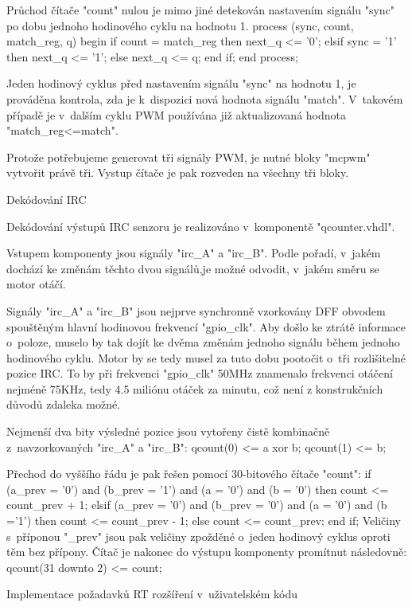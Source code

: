 Průchod čítače "count" nulou je mimo jiné detekován nastavením signálu "sync" po dobu jednoho hodinového cyklu na hodnotu 1.
\begtt
process (sync, count, match_reg, q)  
begin
  if count = match_reg then 
    next_q <= '0';
  elsif sync = '1' then 			
    next_q <= '1';
  else
    next_q <= q;
  end if;
end process;\endtt
  
   Jeden hodinový cyklus před nastavením signálu "sync" na hodnotu 1, je prováděna kontrola, zda je k~dispozici nová hodnota signálu "match". V~takovém případě je v~dalším cyklu PWM používána již aktualizovaná hodnota "match_reg<=match". 

Protože potřebujeme generovat tři signály PWM, je nutné bloky "mcpwm" vytvořit právě tři. Vystup čítače je pak rozveden na všechny tři bloky.  


\sec Dekódování IRC

Dekódování výstupů IRC senzoru je realizováno v~komponentě "qcounter.vhdl". 

Vstupem komponenty jsou signály "irc_A" a "irc_B". Podle pořadí, v~jakém dochází ke změnám těchto dvou signálů,je možné odvodit, v~jakém směru se motor otáčí.

Signály "irc_A" a "irc_B" jsou nejprve synchronně vzorkovány DFF obvodem spouštěným hlavní hodinovou frekvencí "gpio_clk". Aby došlo ke ztrátě informace o~poloze, muselo by tak dojít ke dvěma změnám jednoho signálu během jednoho hodinového cyklu. Motor by se tedy musel za tuto dobu pootočit o~tři rozlišitelné pozice IRC. To by při frekvenci "gpio_clk" 50MHz znamenalo frekvenci otáčení  nejméně 75KHz, tedy 4.5 miliónu otáček za minutu, což není z konstrukčních důvodů zdaleka možné.

Nejmenší dva bity výsledné pozice jsou vytořeny čistě kombinačně z~navzorkovaných "irc_A" a "irc_B":
  \begtt
	qcount(0) <= a xor b;
	qcount(1) <= b;\endtt
 
Přechod do vyššího řádu je pak řešen pomocí 30-bitového čítače "count":
\begtt
	if (a_prev = '0') and (b_prev = '1') and (a = '0') and (b = '0') then 
		  count <= count_prev + 1;
	elsif (a_prev = '0') and (b_prev = '0') and (a = '0') and (b ='1') then 
		  count <= count_prev - 1;
	else
		  count <= count_prev;
	end if;\endtt
Veličiny s~příponou "_prev" jsou pak veličiny zpožděné o~jeden hodinový cyklus oproti těm bez přípony. Čítač je nakonec do výstupu komponenty promítnut následovně:
\begtt
  qcount(31 downto 2) <= count;\endtt

\vfil \break
\sec Implementace požadavků RT rozšíření v~uživatelském kódu 

